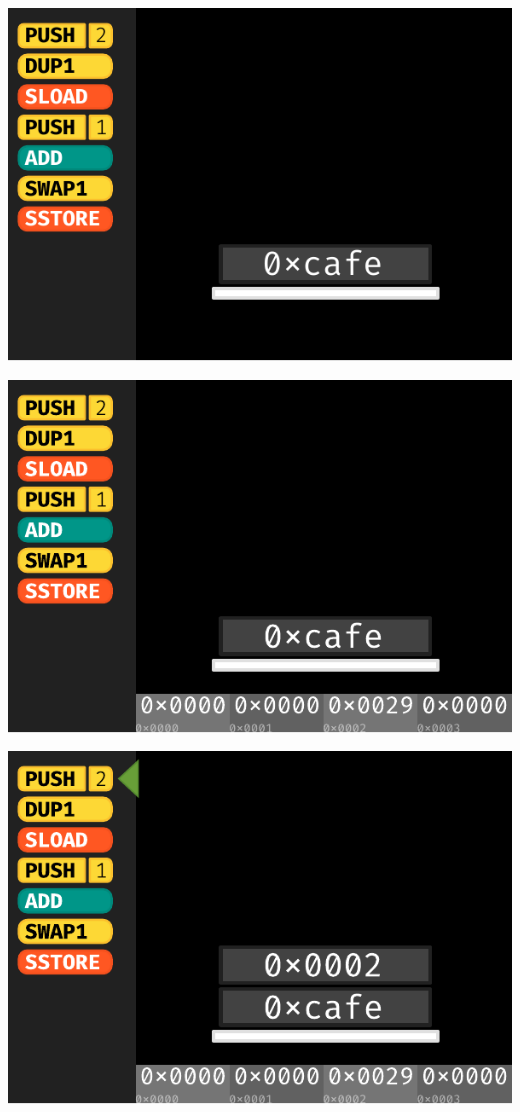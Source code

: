 \documentclass[xcolor=x11names,compress]{beamer}
\begin{document}
\begin{frame}
\begin{overprint}
\begin{center}
			\includegraphics[width=\textwidth,height=0.8\textheight,keepaspectratio]{img/stackmachine/03.pdf}
		\end{center}
		\begin{center}
			\includegraphics[width=\textwidth,height=0.8\textheight,keepaspectratio]{img/stackmachine/04.pdf}
		\end{center}
		\begin{center}
			\includegraphics[width=\textwidth,height=0.8\textheight,keepaspectratio]{img/stackmachine/05.pdf}

\end{center}
\end{overprint}
\end{frame}
\end{document}
